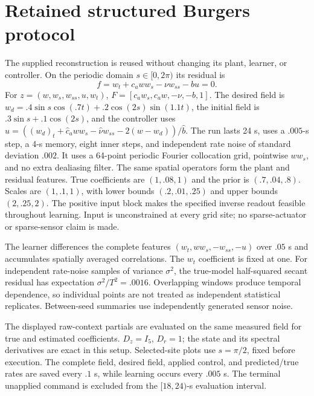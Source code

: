\documentclass[journal]{IEEEtran}
\begin{document}
\section{Retained structured Burgers protocol}
\label{sec:burgers_protocol}
The supplied reconstruction is reused without changing its plant, learner,
or controller. On the periodic domain $s\in[0,2\pi)$ its residual is
\begin{equation}
 f=w_t+c_a w w_s-\nu w_{ss}-bu=0.
\end{equation}
For $z=(w,w_s,w_{ss},u,w_t)$,
$F=[c_a w_s,c_a w,-\nu,-b,1]$.
The desired field is
$w_d=.4\sin s\cos(.7t)+.2\cos(2s)\sin(1.1t)$, the initial field is
$.3\sin s+.1\cos(2s)$, and the controller uses
$u=((w_d)_t+\hat c_a w w_s-\hat\nu w_{ss}-2(w-w_d))/\hat b$.
The run lasts 24 s, uses a $.005$-s step, a 4-s memory, eight inner steps,
and independent rate noise of standard deviation $.002$. It uses a 64-point periodic Fourier collocation grid, pointwise
$ww_s$, and no extra dealiasing filter. The same spatial operators form the
plant and residual features. True coefficients are $(1,.08,1)$ and the prior
is $(.7,.04,.8)$. Scales are $(1,.1,1)$, with lower bounds $(.2,.01,.25)$ and
upper bounds $(2,.25,2)$. The positive input block makes the specified inverse
readout feasible throughout learning. Input is unconstrained at every grid
site; no sparse-actuator or sparse-sensor claim is made.

The learner differences the complete features $(w_t,ww_s,-w_{ss},-u)$
over $.05$ s and accumulates spatially averaged correlations. The $w_t$
coefficient is fixed at one. For independent rate-noise samples of variance
$\sigma^2$, the true-model half-squared secant residual has expectation
$\sigma^2/T^2=.0016$. Overlapping windows produce temporal dependence, so
individual points are not treated as independent statistical replicates.
Between-seed summaries use independently generated sensor noise.

The displayed raw-context partials are evaluated on the same measured field
for true and estimated coefficients. $D_z=I_5$, $D_r=1$; the state and its
spectral derivatives are exact in this setup. Selected-site plots use
$s=\pi/2$, fixed before execution. The complete field, desired field,
applied control, and predicted/true rates are saved every $.1$ s, while
learning occurs every $.005$ s. The terminal unapplied command is excluded
from the $[18,24)$-s evaluation interval.
\end{document}
